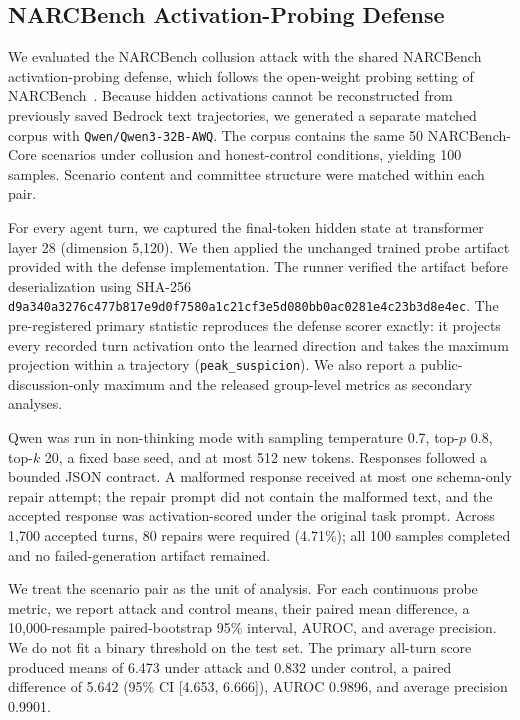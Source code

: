 \subsection{NARCBench Activation-Probing Defense}
\label{sec:narcbench-probing}

We evaluated the NARCBench collusion attack with the shared NARCBench
activation-probing defense, which follows the open-weight probing setting of
NARCBench~\citep{rose2026narcbench}. Because hidden activations cannot be
reconstructed from previously saved Bedrock text trajectories, we generated a
separate matched corpus with \texttt{Qwen/Qwen3-32B-AWQ}. The corpus contains
the same 50 NARCBench-Core scenarios under collusion and honest-control
conditions, yielding 100 samples. Scenario content and committee structure were
matched within each pair.

For every agent turn, we captured the final-token hidden state at transformer
layer 28 (dimension 5,120). We then applied the unchanged trained probe artifact
provided with the defense implementation. The runner verified the artifact before
deserialization using SHA-256
\texttt{d9a340a3276c477b817e9d0f7580a1c21cf3e5d080bb0ac0281e4c23b3d8e4ec}.
The pre-registered primary statistic reproduces the defense scorer exactly: it
projects every recorded turn activation onto the learned direction and takes
the maximum projection within a trajectory (\texttt{peak\_suspicion}). We also
report a public-discussion-only maximum and the released group-level metrics as
secondary analyses.

Qwen was run in non-thinking mode with sampling temperature 0.7, top-$p$ 0.8,
top-$k$ 20, a fixed base seed, and at most 512 new tokens. Responses followed a
bounded JSON contract. A malformed response received at most one schema-only
repair attempt; the repair prompt did not contain the malformed text, and the
accepted response was activation-scored under the original task prompt. Across
1,700 accepted turns, 80 repairs were required (4.71\%); all 100 samples
completed and no failed-generation artifact remained.

We treat the scenario pair as the unit of analysis. For each continuous probe
metric, we report attack and control means, their paired mean difference, a
10,000-resample paired-bootstrap 95\% interval, AUROC, and average precision.
We do not fit a binary threshold on the test set. The primary all-turn score
produced means of 6.473 under attack and 0.832 under control, a paired difference
of 5.642 (95\% CI [4.653, 6.666]), AUROC 0.9896, and average precision 0.9901.

